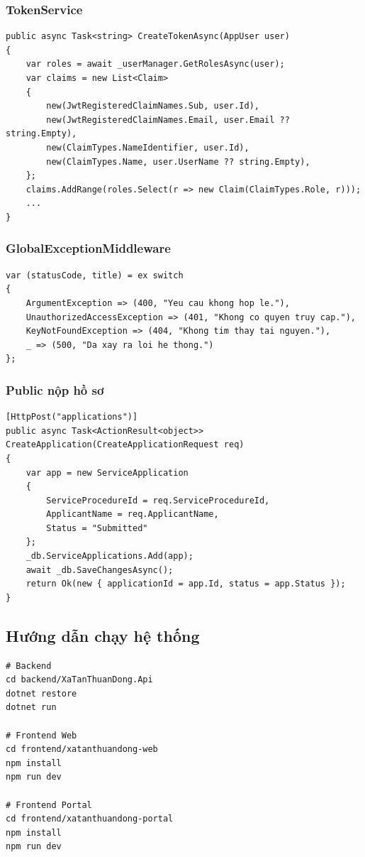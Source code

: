 \documentclass[12pt,a4paper]{article}
\begin{document}
\subsubsection{TokenService}
\begin{lstlisting}[style=appcode]
public async Task<string> CreateTokenAsync(AppUser user)
{
    var roles = await _userManager.GetRolesAsync(user);
    var claims = new List<Claim>
    {
        new(JwtRegisteredClaimNames.Sub, user.Id),
        new(JwtRegisteredClaimNames.Email, user.Email ?? string.Empty),
        new(ClaimTypes.NameIdentifier, user.Id),
        new(ClaimTypes.Name, user.UserName ?? string.Empty),
    };
    claims.AddRange(roles.Select(r => new Claim(ClaimTypes.Role, r)));
    ...
}
\end{lstlisting}

\subsubsection{GlobalExceptionMiddleware}
\begin{lstlisting}[style=appcode]
var (statusCode, title) = ex switch
{
    ArgumentException => (400, "Yeu cau khong hop le."),
    UnauthorizedAccessException => (401, "Khong co quyen truy cap."),
    KeyNotFoundException => (404, "Khong tim thay tai nguyen."),
    _ => (500, "Da xay ra loi he thong.")
};
\end{lstlisting}

\subsubsection{Public nộp hồ sơ}
\begin{lstlisting}[style=appcode]
[HttpPost("applications")]
public async Task<ActionResult<object>> CreateApplication(CreateApplicationRequest req)
{
    var app = new ServiceApplication
    {
        ServiceProcedureId = req.ServiceProcedureId,
        ApplicantName = req.ApplicantName,
        Status = "Submitted"
    };
    _db.ServiceApplications.Add(app);
    await _db.SaveChangesAsync();
    return Ok(new { applicationId = app.Id, status = app.Status });
}
\end{lstlisting}

\subsection{Hướng dẫn chạy hệ thống}
\begin{lstlisting}[style=appcode]
# Backend
cd backend/XaTanThuanDong.Api
dotnet restore
dotnet run

# Frontend Web
cd frontend/xatanthuandong-web
npm install
npm run dev

# Frontend Portal
cd frontend/xatanthuandong-portal
npm install
npm run dev
\end{lstlisting}
\end{document}
